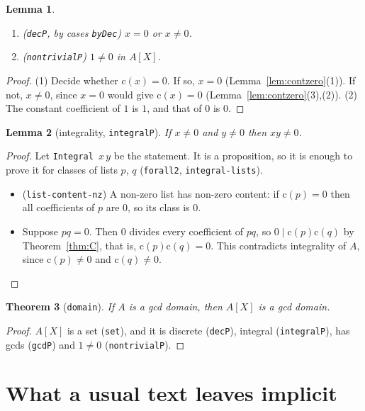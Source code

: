 \documentclass[11pt]{amsart}
\newtheorem{theorem}{Theorem}[section]
\newtheorem{lemma}[theorem]{Lemma}
\theoremstyle{definition}
\theoremstyle{remark}
\newcommand{\nm}[1]{\textup{\texttt{#1}}}
\newcommand{\cont}{\mathrm{c}}
\begin{document}
\begin{lemma}
\begin{enumerate}
\item (\nm{decP}, by cases \nm{byDec}) $x = 0$ or $x\neq0$.
\item (\nm{nontrivialP}) $1\neq0$ in $A[X]$.
\end{enumerate}
\end{lemma}
\begin{proof}
(1) Decide whether $\cont(x)=0$. If so, $x = 0$
(Lemma~\ref{lem:contzero}(1)). If not, $x\neq0$, since $x = 0$ would give
$\cont(x) = 0$ (Lemma~\ref{lem:contzero}(3),(2)).
(2) The constant coefficient of $1$ is $1$, and that of $0$ is $0$.
\end{proof}

\begin{lemma}[integrality, \nm{integralP}]
If $x\neq0$ and $y\neq0$ then $xy\neq0$.
\end{lemma}
\begin{proof}
Let \nm{Integral}~$x\,y$ be the statement. It is a proposition, so it is
enough to prove it for classes of lists $p$, $q$ (\nm{forall2},
\nm{integral-lists}).
\begin{itemize}
\item (\nm{list-content-nz}) A non-zero list has non-zero content: if
  $\cont(p) = 0$ then all coefficients of $p$ are $0$, so its class is
  $0$.
\item Suppose $pq = 0$. Then $0$ divides every coefficient of $pq$, so
  $0\mid\cont(p)\cont(q)$ by Theorem~\ref{thm:C}, that is,
  $\cont(p)\cont(q) = 0$. This contradicts integrality of $A$, since
  $\cont(p)\neq0$ and $\cont(q)\neq0$.\qedhere
\end{itemize}
\end{proof}

\begin{theorem}[\nm{domain}]
If $A$ is a gcd domain, then $A[X]$ is a gcd domain.
\end{theorem}
\begin{proof}
$A[X]$ is a set (\nm{set}), and it is discrete (\nm{decP}), integral
(\nm{integralP}), has gcds (\nm{gcdP}) and $1\neq0$ (\nm{nontrivialP}).
\end{proof}

\section*{What a usual text leaves implicit}
\end{document}
